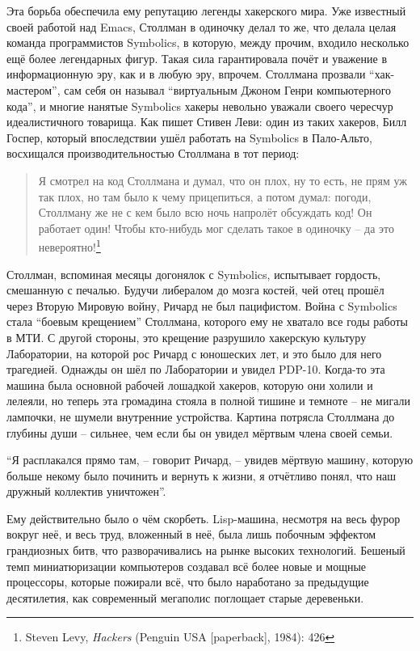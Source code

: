 Эта борьба обеспечила ему репутацию легенды хакерского мира. Уже известный своей работой над Emacs, Столлман в одиночку делал то же, что делала целая команда программистов Symbolics, в которую, между прочим, входило несколько ещё более легендарных фигур. Такая сила гарантировала почёт и уважение в информационную эру, как и в любую эру, впрочем. Столлмана прозвали \enquote{хак-мастером}, сам себя он называл \enquote{виртуальным Джоном Генри компьютерного кода}, и многие нанятые Symbolics хакеры невольно уважали своего чересчур идеалистичного товарища. Как пишет Стивен Леви: один из таких хакеров, Билл Госпер, который впоследствии ушёл работать на Symbolics в Пало-Альто, восхищался производительностью Столлмана в тот период:

\begin{quote}
Я смотрел на код Столлмана и думал, что он плох, ну то есть, не прям уж так плох, но там было к чему прицепиться, а потом думал: погоди, Столлману же не с кем было всю ночь напролёт обсуждать код! Он работает один! Чтобы кто-нибудь мог сделать такое в одиночку -- да это невероятно!\footnote{Steven Levy, \textit{Hackers} (Penguin USA [paperback], 1984): 426}
\end{quote}

Столлман, вспоминая месяцы догонялок с Symbolics, испытывает гордость, смешанную с печалью. Будучи либералом до мозга костей, чей отец прошёл через Вторую Мировую войну, Ричард не был пацифистом. Война с Symbolics стала \enquote{боевым крещением} Столлмана, которого ему не хватало все годы работы в МТИ. С другой стороны, это крещение разрушило хакерскую культуру Лаборатории, на которой рос Ричард с юношеских лет, и это было для него трагедией. Однажды он шёл по Лаборатории и увидел PDP-10. Когда-то эта машина была основной рабочей лошадкой хакеров, которую они холили и лелеяли, но теперь эта громадина стояла в полной тишине и темноте -- не мигали лампочки, не шумели внутренние устройства. Картина потрясла Столлмана до глубины души -- сильнее, чем если бы он увидел мёртвым члена своей семьи.

\enquote{Я расплакался прямо там, -- говорит Ричард, -- увидев мёртвую машину, которую больше некому было починить и вернуть к жизни, я отчётливо понял, что наш дружный коллектив уничтожен}.

Ему действительно было о чём скорбеть. Lisp-машина, несмотря на весь фурор вокруг неё, и весь труд, вложенный в неё, была лишь побочным эффектом грандиозных битв, что разворачивались на рынке высоких технологий. Бешеный темп миниатюризации компьютеров создавал всё более новые и мощные процессоры, которые пожирали всё, что было наработано за предыдущие десятилетия, как современный мегаполис поглощает старые деревеньки.


